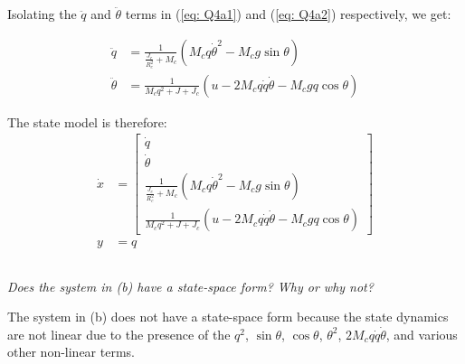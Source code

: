 Isolating the $\ddot{q}$ and $\ddot{\theta}$ terms in (\ref{eq: Q4a1}) and (\ref{eq: Q4a2}) respectively, we get:

\begin{align*}
    \ddot{q} &= \frac{1}{\frac{J_c}{R_{c}^2} + M_c} \left(M_{c}q \dot{\theta}^2 - M_{c}g \sin{\theta}\right) \\
    \ddot{\theta} &= \frac{1}{M_{c}q^2 + J + J_c} \left(u - 2M_{c}q \dot{q} \dot{\theta} - M_{c}gq \cos{\theta}\right)
\end{align*}

The state model is therefore:
\begin{align*}
    \dot{x} &=
    \begin{bmatrix}
        \dot{q} \\
        \dot{\theta} \\
        \frac{1}{\frac{J_c}{R_{c}^2} + M_c} \left(M_{c}q \dot{\theta}^2 - M_{c}g \sin{\theta}\right) \\
        \frac{1}{M_{c}q^2 + J + J_c} \left(u - 2M_{c}q \dot{q} \dot{\theta} - M_{c}gq \cos{\theta}\right)
    \end{bmatrix} \\
    y &= q
\end{align*}

\subsection{}
\textit{Does the system in (b) have a state-space form? Why or why not?}

The system in (b) does not have a state-space form because the state dynamics are not linear due to the presence of 
the $q^2$, $\sin{\theta}$, $\cos{\theta}$, $\theta^2$, $2M_{c}q \dot{q} \dot{\theta}$, and various other non-linear terms.
    
        


